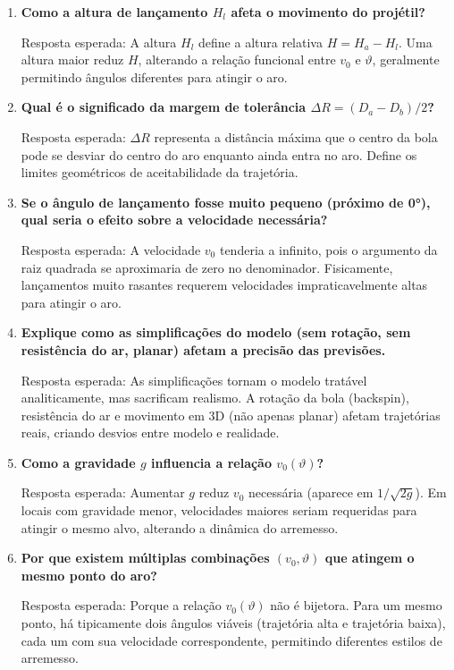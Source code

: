 \documentclass[12pt,a4paper]{article}
\begin{document}
\begin{enumerate}
    \item \textbf{Como a altura de lançamento $H_l$ afeta o movimento do projétil?} \par
    Resposta esperada: A altura $H_l$ define a altura relativa $H = H_a - H_l$. Uma altura maior reduz $H$, alterando a relação funcional entre $v_0$ e $\vartheta$, geralmente permitindo ângulos diferentes para atingir o aro.
    
    \item \textbf{Qual é o significado da margem de tolerância $\Delta R = (D_a - D_b)/2$?} \par
    Resposta esperada: $\Delta R$ representa a distância máxima que o centro da bola pode se desviar do centro do aro enquanto ainda entra no aro. Define os limites geométricos de aceitabilidade da trajetória.
    
    \item \textbf{Se o ângulo de lançamento fosse muito pequeno (próximo de 0°), qual seria o efeito sobre a velocidade necessária?} \par
    Resposta esperada: A velocidade $v_0$ tenderia a infinito, pois o argumento da raiz quadrada se aproximaria de zero no denominador. Fisicamente, lançamentos muito rasantes requerem velocidades impraticavelmente altas para atingir o aro.
    
    \item \textbf{Explique como as simplificações do modelo (sem rotação, sem resistência do ar, planar) afetam a precisão das previsões.} \par
    Resposta esperada: As simplificações tornam o modelo tratável analiticamente, mas sacrificam realismo. A rotação da bola (backspin), resistência do ar e movimento em 3D (não apenas planar) afetam trajetórias reais, criando desvios entre modelo e realidade.
    
    \item \textbf{Como a gravidade $g$ influencia a relação $v_0(\vartheta)$?} \par
    Resposta esperada: Aumentar $g$ reduz $v_0$ necessária (aparece em $1/\sqrt{2g}$). Em locais com gravidade menor, velocidades maiores seriam requeridas para atingir o mesmo alvo, alterando a dinâmica do arremesso.
    
    \item \textbf{Por que existem múltiplas combinações $(v_0, \vartheta)$ que atingem o mesmo ponto do aro?} \par
    Resposta esperada: Porque a relação $v_0(\vartheta)$ não é bijetora. Para um mesmo ponto, há tipicamente dois ângulos viáveis (trajetória alta e trajetória baixa), cada um com sua velocidade correspondente, permitindo diferentes estilos de arremesso.

\end{enumerate}
\end{document}
